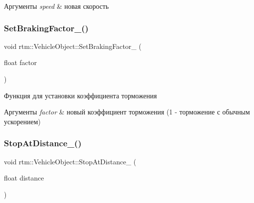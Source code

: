 \begin{DoxyParams}{Аргументы}
{\em speed} & новая скорость \\
\hline
\end{DoxyParams}
\mbox{\label{classrtm_1_1_vehicle_object_a3c2db832bf74ea5bd226e98e24b3da4b}} 
\subsubsection{\texorpdfstring{Set\+Braking\+Factor\+\_\+()}{SetBrakingFactor\_()}}
{\footnotesize\ttfamily void rtm\+::\+Vehicle\+Object\+::\+Set\+Braking\+Factor\+\_\+ (\begin{DoxyParamCaption}\item[{float}]{factor }\end{DoxyParamCaption})\hspace{0.3cm}{\ttfamily [protected]}}



Функция для установки коэффициента торможения 


\begin{DoxyParams}{Аргументы}
{\em factor} & новый коэффициент торможения (1 -\/ торможение с обычным ускорением) \\
\hline
\end{DoxyParams}
\mbox{\label{classrtm_1_1_vehicle_object_a124909b0d2443d501d9b1eb8d359ad5a}} 
\subsubsection{\texorpdfstring{Stop\+At\+Distance\+\_\+()}{StopAtDistance\_()}}
{\footnotesize\ttfamily void rtm\+::\+Vehicle\+Object\+::\+Stop\+At\+Distance\+\_\+ (\begin{DoxyParamCaption}\item[{float}]{distance }\end{DoxyParamCaption})\hspace{0.3cm}{\ttfamily [protected]}}




